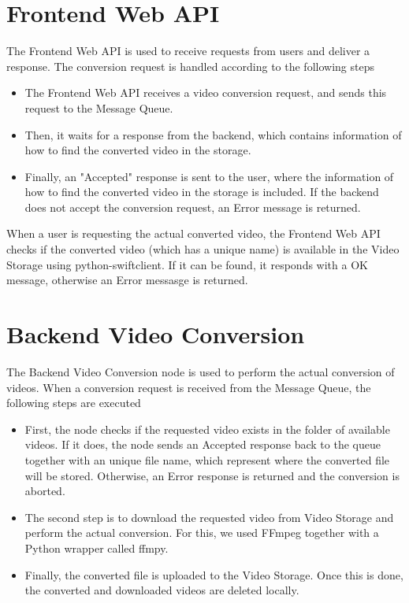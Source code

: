 \documentclass[a4paper, 10pt, english]{article}
\begin{document}
\section{Frontend Web API} \label{sec:FE}
The Frontend Web API is used to receive requests from users and deliver a response. The conversion request is handled according to the following steps
\begin{itemize}
	\item The Frontend Web API receives a video conversion request, and sends this request to the Message Queue.
	\item Then, it waits for a response from the backend, which contains information of how to find the converted video in the storage.
	\item Finally, an "Accepted" response is sent to the user, where the information of how to find the converted video in the storage is included. If the backend does not accept the conversion request, an Error message is returned. 
\end{itemize}
When a user is requesting the actual converted video, the Frontend Web API checks if the converted video (which has a unique name) is available in the Video Storage using python-swiftclient. If it can be found, it responds with a OK message, otherwise an Error messasge is returned.


\section{Backend Video Conversion} \label{sec:BE}
The Backend Video Conversion node is used to perform the actual conversion of videos. When a conversion request is received from the Message Queue, the following steps are executed
\begin{itemize}
	\item First, the node checks if the requested video exists in the folder of available videos. If it does, the node sends an Accepted response back to the queue together with an unique file name, which represent where the converted file will be stored. Otherwise, an Error response is returned and the conversion is aborted. 
	\item The second step is to download the requested video from Video Storage and perform the actual conversion. For this, we used FFmpeg together with a Python wrapper called ffmpy.
	\item Finally, the converted file is uploaded to the Video Storage. Once this is done, the converted and downloaded videos are deleted locally.
\end{itemize}
\end{document}
